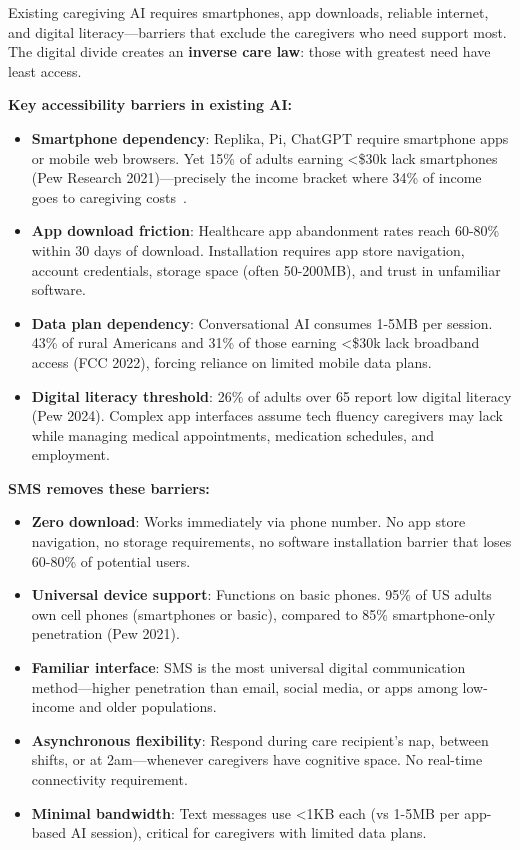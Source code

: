\documentclass{article}
\begin{document}
Existing caregiving AI requires smartphones, app downloads, reliable internet, and digital literacy—barriers that exclude the caregivers who need support most. The digital divide creates an \textbf{inverse care law}: those with greatest need have least access.

\textbf{Key accessibility barriers in existing AI:}
\begin{itemize}
    \item \textbf{Smartphone dependency}: Replika, Pi, ChatGPT require smartphone apps or mobile web browsers. Yet 15\% of adults earning <\$30k lack smartphones (Pew Research 2021)—precisely the income bracket where 34\% of income goes to caregiving costs~\cite{aarp2025}.
    \item \textbf{App download friction}: Healthcare app abandonment rates reach 60-80\% within 30 days of download. Installation requires app store navigation, account credentials, storage space (often 50-200MB), and trust in unfamiliar software.
    \item \textbf{Data plan dependency}: Conversational AI consumes 1-5MB per session. 43\% of rural Americans and 31\% of those earning <\$30k lack broadband access (FCC 2022), forcing reliance on limited mobile data plans.
    \item \textbf{Digital literacy threshold}: 26\% of adults over 65 report low digital literacy (Pew 2024). Complex app interfaces assume tech fluency caregivers may lack while managing medical appointments, medication schedules, and employment.
\end{itemize}

\textbf{SMS removes these barriers:}
\begin{itemize}
    \item \textbf{Zero download}: Works immediately via phone number. No app store navigation, no storage requirements, no software installation barrier that loses 60-80\% of potential users.
    \item \textbf{Universal device support}: Functions on basic phones. 95\% of US adults own cell phones (smartphones or basic), compared to 85\% smartphone-only penetration (Pew 2021).
    \item \textbf{Familiar interface}: SMS is the most universal digital communication method—higher penetration than email, social media, or apps among low-income and older populations.
    \item \textbf{Asynchronous flexibility}: Respond during care recipient's nap, between shifts, or at 2am—whenever caregivers have cognitive space. No real-time connectivity requirement.
    \item \textbf{Minimal bandwidth}: Text messages use <1KB each (vs 1-5MB per app-based AI session), critical for caregivers with limited data plans.
\end{itemize}
\end{document}
